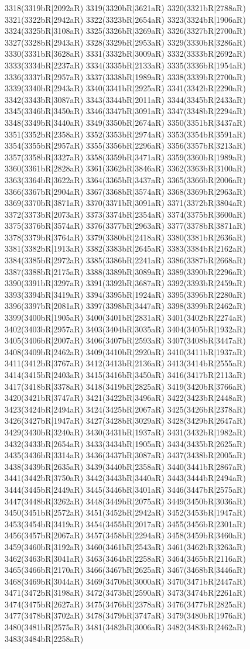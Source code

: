 3318(3319bR|2092aR) 3319(3320bR|3621aR) 3320(3321bR|2788aR) 3321(3322bR|2942aR) 3322(3323bR|2654aR) 3323(3324bR|1906aR) 3324(3325bR|3108aR) 3325(3326bR|3269aR) 3326(3327bR|2700aR) 3327(3328bR|2943aR) 3328(3329bR|2953aR) 3329(3330bR|3286aR) 3330(3331bR|3628aR) 3331(3332bR|3009aR) 3332(3333bR|2692aR) 3333(3334bR|2237aR) 3334(3335bR|2133aR) 3335(3336bR|1954aR) 3336(3337bR|2957aR) 3337(3338bR|1989aR) 3338(3339bR|2700aR) 3339(3340bR|2943aR) 3340(3341bR|2925aR) 3341(3342bR|2290aR) 3342(3343bR|3087aR) 3343(3344bR|2011aR) 3344(3345bR|2433aR) 3345(3346bR|3450aR) 3346(3347bR|3091aR) 3347(3348bR|2294aR) 3348(3349bR|3440aR) 3349(3350bR|2674aR) 3350(3351bR|3437aR) 3351(3352bR|2358aR) 3352(3353bR|2974aR) 3353(3354bR|3591aR) 3354(3355bR|2957aR) 3355(3356bR|2296aR) 3356(3357bR|3213aR) 3357(3358bR|3327aR) 3358(3359bR|3471aR) 3359(3360bR|1989aR) 3360(3361bR|2828aR) 3361(3362bR|3846aR) 3362(3363bR|3100aR) 3363(3364bR|3622aR) 3364(3365bR|3437aR) 3365(3366bR|2006aR) 3366(3367bR|2904aR) 3367(3368bR|3574aR) 3368(3369bR|2963aR) 3369(3370bR|3871aR) 3370(3371bR|3091aR) 3371(3372bR|3804aR) 3372(3373bR|2073aR) 3373(3374bR|2354aR) 3374(3375bR|3600aR) 3375(3376bR|3574aR) 3376(3377bR|2963aR) 3377(3378bR|3871aR) 3378(3379bR|3764aR) 3379(3380bR|2418aR) 3380(3381bR|2636aR) 3381(3382bR|1913aR) 3382(3383bR|2645aR) 3383(3384bR|2162aR) 3384(3385bR|2972aR) 3385(3386bR|2241aR) 3386(3387bR|2668aR) 3387(3388bR|2175aR) 3388(3389bR|3089aR) 3389(3390bR|2296aR) 3390(3391bR|3297aR) 3391(3392bR|3687aR) 3392(3393bR|2459aR) 3393(3394bR|3419aR) 3394(3395bR|1924aR) 3395(3396bR|2280aR) 3396(3397bR|2081aR) 3397(3398bR|3447aR) 3398(3399bR|2462aR) 3399(3400bR|1905aR) 3400(3401bR|2831aR) 3401(3402bR|2274aR) 3402(3403bR|2957aR) 3403(3404bR|3035aR) 3404(3405bR|1932aR) 3405(3406bR|2007aR) 3406(3407bR|2593aR) 3407(3408bR|3447aR) 3408(3409bR|2462aR) 3409(3410bR|2920aR) 3410(3411bR|1937aR) 3411(3412bR|3767aR) 3412(3413bR|2136aR) 3413(3414bR|2555aR) 3414(3415bR|2403aR) 3415(3416bR|3450aR) 3416(3417bR|2113aR) 3417(3418bR|3378aR) 3418(3419bR|2825aR) 3419(3420bR|3766aR) 3420(3421bR|3747aR) 3421(3422bR|3496aR) 3422(3423bR|2448aR) 3423(3424bR|2494aR) 3424(3425bR|2067aR) 3425(3426bR|2378aR) 3426(3427bR|1947aR) 3427(3428bR|3029aR) 3428(3429bR|2647aR) 3429(3430bR|3240aR) 3430(3431bR|1937aR) 3431(3432bR|1982aR) 3432(3433bR|2654aR) 3433(3434bR|1905aR) 3434(3435bR|2625aR) 3435(3436bR|3314aR) 3436(3437bR|3087aR) 3437(3438bR|2005aR) 3438(3439bR|2635aR) 3439(3440bR|2358aR) 3440(3441bR|2867aR) 3441(3442bR|3750aR) 3442(3443bR|3440aR) 3443(3444bR|2494aR) 3444(3445bR|2449aR) 3445(3446bR|3401aR) 3446(3447bR|2575aR) 3447(3448bR|3262aR) 3448(3449bR|2075aR) 3449(3450bR|3036aR) 3450(3451bR|2572aR) 3451(3452bR|2942aR) 3452(3453bR|1947aR) 3453(3454bR|3419aR) 3454(3455bR|2017aR) 3455(3456bR|2301aR) 3456(3457bR|2067aR) 3457(3458bR|2294aR) 3458(3459bR|3460aR) 3459(3460bR|3192aR) 3460(3461bR|2543aR) 3461(3462bR|3263aR) 3462(3463bR|3041aR) 3463(3464bR|2258aR) 3464(3465bR|2116aR) 3465(3466bR|2170aR) 3466(3467bR|2625aR) 3467(3468bR|3446aR) 3468(3469bR|3044aR) 3469(3470bR|3000aR) 3470(3471bR|2447aR) 3471(3472bR|3198aR) 3472(3473bR|2590aR) 3473(3474bR|2261aR) 3474(3475bR|2627aR) 3475(3476bR|2378aR) 3476(3477bR|2825aR) 3477(3478bR|3702aR) 3478(3479bR|3747aR) 3479(3480bR|1976aR) 3480(3481bR|2575aR) 3481(3482bR|3006aR) 3482(3483bR|2462aR) 3483(3484bR|2258aR) 
